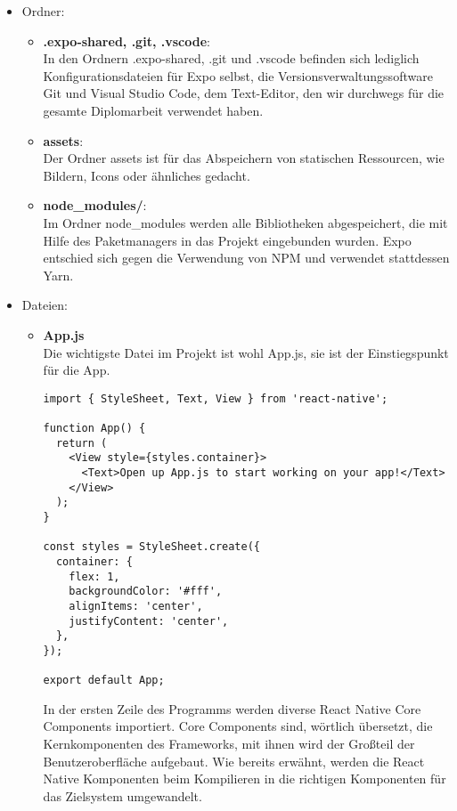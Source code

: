 \begin{itemize}
  \item Ordner:
  \begin{itemize}
    \item \textbf{.expo-shared, .git, .vscode}:\\
In den Ordnern .expo-shared, .git und .vscode befinden sich lediglich Konfigurationsdateien für Expo
selbst, die Versionsverwaltungssoftware Git und Visual Studio Code, dem Text-Editor, den wir
durchwegs für die gesamte Diplomarbeit verwendet haben.

    \item \textbf{assets}:\\
Der Ordner assets ist für das Abspeichern von statischen Ressourcen, wie Bildern, Icons oder
ähnliches gedacht.

    \item \textbf{node\_modules/}:\\
Im Ordner node\_modules werden alle Bibliotheken abgespeichert, die mit Hilfe des Paketmanagers
in das Projekt eingebunden wurden. Expo entschied sich gegen die Verwendung von NPM und verwendet
stattdessen Yarn.
  \end{itemize}

\newpage

  \item Dateien:
  \begin{itemize}
    \item \textbf{App.js}\\
Die wichtigste Datei im Projekt ist wohl App.js, sie ist der Einstiegspunkt für die App.

\begin{lstlisting}
import { StyleSheet, Text, View } from 'react-native';

function App() {
  return (
    <View style={styles.container}>
      <Text>Open up App.js to start working on your app!</Text>
    </View>
  );
}

const styles = StyleSheet.create({
  container: {
    flex: 1,
    backgroundColor: '#fff',
    alignItems: 'center',
    justifyContent: 'center',
  },
});

export default App;
\end{lstlisting}

In der ersten Zeile des Programms werden diverse React Native Core Components importiert. Core
Components sind, wörtlich übersetzt, die Kernkomponenten des Frameworks, mit ihnen wird der Großteil
der Benutzeroberfläche aufgebaut. Wie bereits erwähnt, werden die React Native Komponenten beim
Kompilieren in die richtigen Komponenten für das Zielsystem umgewandelt.


\end{itemize}
\end{itemize}
